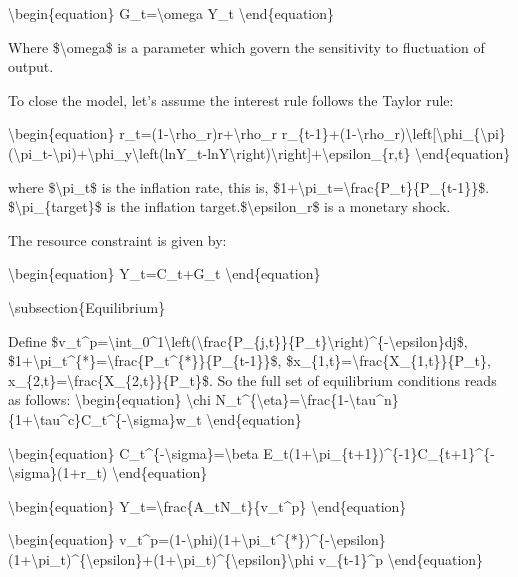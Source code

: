 \documentclass[10pt,math=newtx,citestyle=gb7714-2015,bibstyle=gb7714-2015]{elegantbook}
\begin{document}
	\textbackslash{}begin\{equation\}
	G\_t=\textbackslash{}omega Y\_t
	\textbackslash{}end\{equation\}
	
	Where \$\textbackslash{}omega\$ is a parameter which govern the sensitivity to fluctuation of output.
	
	To close the model, let's assume the interest rule follows the Taylor rule:
	
	\textbackslash{}begin\{equation\}
	r\_t=(1-\textbackslash{}rho\_r)r+\textbackslash{}rho\_r r\_\{t-1\}+(1-\textbackslash{}rho\_r)\textbackslash{}left[\textbackslash{}phi\_\{\textbackslash{}pi\}(\textbackslash{}pi\_t-\textbackslash{}pi)+\textbackslash{}phi\_y\textbackslash{}left(lnY\_t-lnY\textbackslash{}right)\textbackslash{}right]+\textbackslash{}epsilon\_\{r,t\}
	\textbackslash{}end\{equation\}
	
	where \$\textbackslash{}pi\_t\$ is the inflation rate, this is, \$1+\textbackslash{}pi\_t=\textbackslash{}frac\{P\_t\}\{P\_\{t-1\}\}\$. \$\textbackslash{}pi\_\{target\}\$ is the inflation target.\$\textbackslash{}epsilon\_r\$ is a monetary shock.
	
	The resource constraint is given by:
	
	\textbackslash{}begin\{equation\}
	Y\_t=C\_t+G\_t
	\textbackslash{}end\{equation\}
	
	\textbackslash{}subsection\{Equilibrium\}
	
	Define \$v\_t\^{}p=\textbackslash{}int\_0\^{}1\textbackslash{}left(\textbackslash{}frac\{P\_\{j,t\}\}\{P\_t\}\textbackslash{}right)\^{}\{-\textbackslash{}epsilon\}dj\$, \$1+\textbackslash{}pi\_t\^{}\{*\}=\textbackslash{}frac\{P\_t\^{}\{*\}\}\{P\_\{t-1\}\}\$, \$x\_\{1,t\}=\textbackslash{}frac\{X\_\{1,t\}\}\{P\_t\}, x\_\{2,t\}=\textbackslash{}frac\{X\_\{2,t\}\}\{P\_t\}\$. So the full set of equilibrium conditions reads as follows:
	\textbackslash{}begin\{equation\}
	\textbackslash{}chi N\_t\^{}\{\textbackslash{}eta\}=\textbackslash{}frac\{1-\textbackslash{}tau\^{}n\}\{1+\textbackslash{}tau\^{}c\}C\_t\^{}\{-\textbackslash{}sigma\}w\_t
	\textbackslash{}end\{equation\}
	
	\textbackslash{}begin\{equation\}
	C\_t\^{}\{-\textbackslash{}sigma\}=\textbackslash{}beta E\_t(1+\textbackslash{}pi\_\{t+1\})\^{}\{-1\}C\_\{t+1\}\^{}\{-\textbackslash{}sigma\}(1+r\_t)
	\textbackslash{}end\{equation\}
	
	\textbackslash{}begin\{equation\}
	Y\_t=\textbackslash{}frac\{A\_tN\_t\}\{v\_t\^{}p\}
	\textbackslash{}end\{equation\}
	
	\textbackslash{}begin\{equation\}
	v\_t\^{}p=(1-\textbackslash{}phi)(1+\textbackslash{}pi\_t\^{}\{*\})\^{}\{-\textbackslash{}epsilon\}(1+\textbackslash{}pi\_t)\^{}\{\textbackslash{}epsilon\}+(1+\textbackslash{}pi\_t)\^{}\{\textbackslash{}epsilon\}\textbackslash{}phi v\_\{t-1\}\^{}p
	\textbackslash{}end\{equation\}
	
\end{document}

